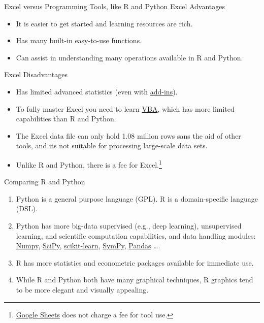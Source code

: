 \documentclass[pdf]{beamer}
\theoremstyle{remark}
\theoremstyle{definition}
\begin{document}
\begin{frame}[t]{Excel versus Programming Tools, like R and Python}
Excel Advantages \\
\vspace{0ex}
\small
\begin{itemize}
  \item It is easier to get started and learning resources are rich.
  \item Has many built-in easy-to-use functions. 
  \item Can assist in understanding many operations available in R and Python.  
\end{itemize}
\vspace{-1.5ex}
\normalsize
Excel Disadvantages \\
\vspace{0ex}
\small
\begin{itemize}
  \item Has limited advanced statistics (even with \href{https://learn.microsoft.com/en-us/office/dev/add-ins/excel/excel-add-ins-overview}{add-ins}).
  \item To fully master Excel you need to learn \href{https://learn.microsoft.com/en-us/office/vba/library-reference/concepts/getting-started-with-vba-in-office}{VBA}, which has more limited capabilities than R and Python. 
  \item The Excel data file can only hold 1.08 million rows sans the aid of other tools, and its not suitable for processing large-scale data sets.
  \item Unlike R and Python, there is a fee for Excel.\footnote{\href{https://www.google.com/sheets/about/}{Google Sheets} does not charge a fee for tool use.}
\end{itemize}
\end{frame}

\begin{frame}[t]{Comparing R and Python}
\begin{enumerate}
  \item Python is a general purpose language (GPL). R is a domain-specific language (DSL). 
  \item Python has more big-data supervised (e.g., deep learning), unsupervised learning, and scientific computation capabilities, and data handling modules:  \href{https://numpy.org/}{Numpy}, \href{https://scipy.org/}{SciPy}, \href{https://scikit-learn.org/stable/}{scikit-learn}, \href{https://www.sympy.org/en/index.html}{SymPy}, \href{https://pandas.pydata.org/}{Pandas} \ldots. 
  \item R has more statistics and econometric packages available for immediate use. 
  \item While R and Python both have many graphical techniques, R graphics tend to be more elegant and  visually appealing. 
\end{enumerate}
\end{frame}
\end{document}
